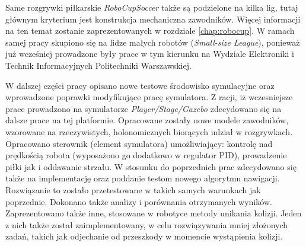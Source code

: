 Same rozgrywki piłkarskie \emph{RoboCupSoccer} także są podzielone na kilka lig, tutaj głównym kryterium jest konstrukcja mechaniczna zawodników. Więcej informacji na ten temat zostanie zaprezentowanych w rozdziale
\ref{chap:robocup}. W ramach samej pracy skupiono się na lidze małych robotów (\emph{Small-size League}), ponieważ już wcześniej prowadzone były prace w tym kierunku na Wydziale Elektroniki i 
Technik Informacyjnych Politechniki Warszawskiej.

W dalszej części pracy opisano nowe testowe środowisko symulacyjne oraz wprowadzone poprawki modyfikujące pracę symulatora.
Z racji, iż wczesniejsze prace prowadzono na symulatorze \emph{Player/Stage/Gazebo} zdecydowano się na dalsze prace na tej platformie.
Opracowane zostały nowe modele zawodników, wzorowane na rzeczywistych, holonomicznych
biorących udział w rozgrywkach. Opracowano sterownik (element symulatora) umożliwiający: kontrolę nad prędkością robota (wyposażono go dodatkowo w regulator PID), prowadzenie piłki jak i oddawanie strzału.
 W stosunku do poprzednich prac zdecydowano się także na implementację oraz poddanie testom nowego algorytmu nawigacji.  Rozwiązanie to zostało przetestowane w takich samych warunkach 
jak poprzednie. Dokonano także analizy i porównania otrzymanych wyników. Zaprezentowano także inne, stosowane w robotyce metody unikania kolizji. Jeden z nich także został zaimplementowany, w celu
rozwiązywania mniej złożonych zadań, takich jak odjechanie od przeszkody w momencie wystąpienia kolizji.

